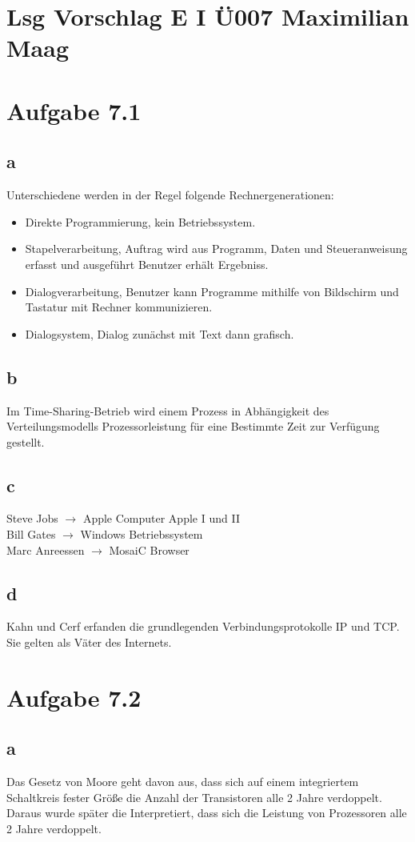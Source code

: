\documentclass{article}
\begin{document}
	\section*{Lsg Vorschlag E I Ü007 Maximilian Maag}
	\section*{Aufgabe 7.1}
	\subsection*{a}
	Unterschiedene werden in der Regel folgende Rechnergenerationen: \\
	\begin{itemize}
		\item Direkte Programmierung, kein Betriebssystem.
		\item Stapelverarbeitung, Auftrag wird aus Programm, Daten und Steueranweisung erfasst und ausgeführt Benutzer erhält Ergebniss.
		\item Dialogverarbeitung, Benutzer kann Programme mithilfe von Bildschirm und Tastatur mit Rechner kommunizieren.
		\item Dialogsystem, Dialog zunächst mit Text dann grafisch.
	\end{itemize}
	\subsection*{b}
	Im Time-Sharing-Betrieb wird einem Prozess in Abhängigkeit des Verteilungsmodells Prozessorleistung für eine Bestimmte Zeit zur Verfügung gestellt.
	\subsection*{c}
	Steve Jobs $\to$ Apple Computer Apple I und II \\
	Bill Gates $\to$ Windows Betriebssystem \\
	Marc Anreessen $\to$ MosaiC Browser
	\subsection*{d}
	Kahn und Cerf erfanden die grundlegenden Verbindungsprotokolle IP und TCP. Sie gelten als Väter des Internets.
	
	\section*{Aufgabe 7.2}
	\subsection*{a}
	Das Gesetz von Moore geht davon aus, dass sich auf einem integriertem Schaltkreis fester Größe die Anzahl der Transistoren alle 2 Jahre verdoppelt. Daraus wurde später die Interpretiert, dass sich die Leistung von Prozessoren alle 2 Jahre verdoppelt.
\end{document}
